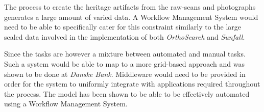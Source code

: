The process to create the heritage artifacts from the raw-scans and photographs
generates a large amount of varied data. A Workflow Management System would need
to be able to specifically cater for this constraint similarly to the large scaled
data involved in the implementation of both \emph{OrthoSearch} and \emph{Sunfall}.


Since the tasks are however a mixture between automated and manual tasks. Such a
system would be able to map to a more grid-based approach and was shown to be done
at \emph{Danske Bank}. Middleware would need to be provided in order for the system 
to uniformly integrate with applications required throughout the process\cite{Montella:2007:UGC:1272980.1272995}.
The model has been shown to be able to be effectively automated using a Workflow Management System\cite{Withana:2010:VWE:1851476.1851586}. 
